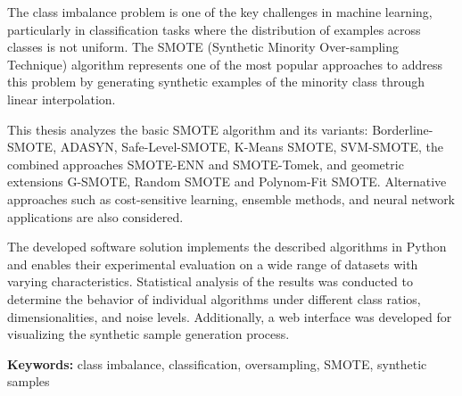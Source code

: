 
The class imbalance problem is one of the key challenges in machine
learning, particularly in classification tasks where the distribution of
examples across classes is not uniform. The SMOTE (Synthetic Minority
Over-sampling Technique) algorithm represents one of the most popular
approaches to address this problem by generating synthetic examples of
the minority class through linear interpolation.

This thesis analyzes the basic SMOTE algorithm and its variants:
Borderline-SMOTE, ADASYN, Safe-Level-SMOTE, K-Means SMOTE, SVM-SMOTE,
the combined approaches SMOTE-ENN and SMOTE-Tomek, and geometric
extensions G-SMOTE, Random SMOTE and Polynom-Fit SMOTE. Alternative
approaches such as cost-sensitive learning, ensemble methods, and neural
network applications are also considered.

The developed software solution implements the described algorithms in
Python and enables their experimental evaluation on a wide range of
datasets with varying characteristics. Statistical analysis of the
results was conducted to determine the behavior of individual algorithms
under different class ratios, dimensionalities, and noise levels.
Additionally, a web interface was developed for visualizing the synthetic
sample generation process.

\bigskip
\noindent\textbf{Keywords:} class imbalance, classification, oversampling,
SMOTE, synthetic samples
